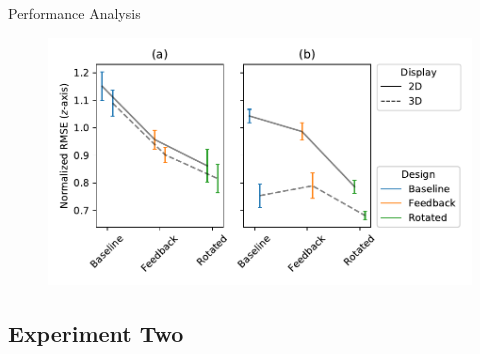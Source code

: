 \documentclass[10pt]{beamer}
\begin{document}
\begin{frame}[fragile]{Performance Analysis}
\begin{figure}
  \begin{center}
    \includegraphics[width=\linewidth]{../img/x_design_y_zrmse_hue_device_col_cbf_first.pdf}
  \end{center}
\end{figure}
\end{frame}

\subsection{Experiment Two}
\end{document}
